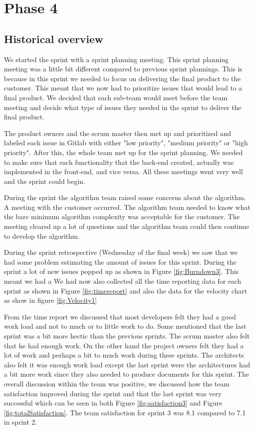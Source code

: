 \documentclass{article}
\begin{document}
\section{Phase 4} %
\subsection{Historical overview}
We started the sprint with a sprint planning meeting. This sprint planning meeting was a little bit different compared to previous sprint plannings. This is because in this sprint we needed to focus on delivering the final product to the customer. This meant that we now had to prioritize issues that would lead to a final product. We decided that each sub-team would meet before the team meeting and decide what type of issues they needed in the sprint to deliver the final product. 

The product owners and the scrum master then met up and prioritized and labeled each issue in Gitlab with either "low priority", "medium priority" or "high priority". After this, the whole team met up for the sprint planning. We needed to make sure that each functionality that the back-end created, actually was implemented in the front-end, and vice versa. All these meetings went very well and the sprint could begin. 

During the sprint the algorithm team raised some concerns about the algorithm. A meeting with the customer occurred. The algorithm team needed to know what the bare minimum algorithm complexity was acceptable for the customer. The meeting cleared up a lot of questions and the algorithm team could then continue to develop the algorithm. 

During the sprint retrospective (Wednesday of the final week) we saw that we had some problem estimating the amount of issues for this sprint. During the sprint a lot of new issues popped up as shown in Figure \ref{fig:Burndown3}. %
This meant we had a %
We had now also collected all the time reporting data for each sprint as shown in Figure \ref{fig:timereport} and also the data for the velocity chart as show in figure \ref{fig:Velocity1} %

From the time report we discussed that most developers felt they had a good work load and not to much or to little work to do. Some mentioned that the last sprint was a bit more hectic than the previous sprints. The scrum master also felt that he had enough work. On the other hand the project owners felt they had a lot of work and perhaps a bit to much work during these sprints. The architects also felt it was enough work load except the last sprint were the architectures had a bit more work since they also needed to produce documents for this sprint. The overall discussion within the team was positive, we discussed how the team satisfaction improved during the sprint and that the last sprint was very successful which can be seen in both Figure \ref{fig:satisfaction3} and Figure \ref{fig:totalSatisfaction}. The team satisfaction for sprint 3 was 8.1 compared to 7.1 in sprint 2. 
\end{document}
